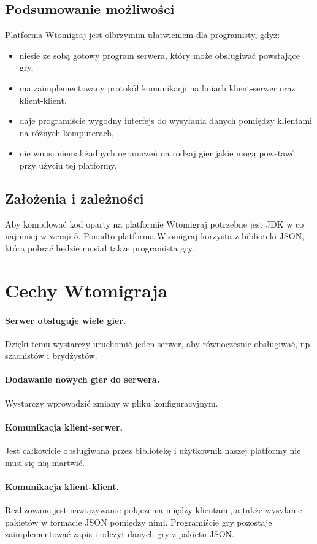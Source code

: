 \documentclass[a4paper, 12pt]{article}
\begin{document}
\subsection[Podsumowanie możliwości]{Podsumowanie możliwości}
Platforma Wtomigraj jest olbrzymim ułatwieniem dla programisty, gdyż:
\begin{itemize}
 \item niesie ze sobą gotowy program serwera, który może obsługiwać powstające gry,
 \item ma zaimplementowany protokół komunikacji na liniach klient-serwer oraz klient-klient,
 \item daje programiście wygodny interfejs do wysyłania danych pomiędzy klientami na różnych komputerach,
 \item nie wnosi niemal żadnych ograniczeń na rodzaj gier jakie mogą powstawć przy użyciu tej platformy.
\end{itemize}

\subsection[Założenia i zależności]{Założenia i zależności}
Aby kompilować kod oparty na platformie Wtomigraj potrzebne jest JDK w co najmniej w wersji 5. Ponadto platforma Wtomigraj korzysta z biblioteki JSON, którą pobrać będzie musiał także programista gry.

\section[Cechy Wtomigraja]{Cechy Wtomigraja}
\paragraph{Serwer obsługuje wiele gier.} Dzięki temu wystarczy uruchomić jeden serwer, aby równoczesnie obsługiwać, np. szachistów i brydżystów.
\paragraph{Dodawanie nowych gier do serwera.} Wystarczy wprowadzić zmiany w pliku konfiguracyjnym.
\paragraph{Komunikacja klient-serwer.} Jest całkowicie obsługiwana przez bibliotekę i użytkownik naszej platformy nie musi się nią martwić.
\paragraph{Komunikacja klient-klient.} Realizowane jest nawiązywanie połączenia między klientami, a także wysyłanie pakietów w formacie JSON pomiędzy nimi. Programiście gry pozostaje zaimplementować zapis i odczyt danych gry z pakietu JSON.
\end{document}
